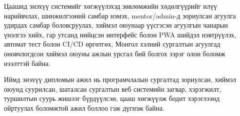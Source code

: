 Цаашид энэхүү системийг хөгжүүлэхэд зөвлөмжийн хөдөлгүүрийг илүү нарийвчлах, шинжилгээний самбар нэмэх, mentor/admin-д зориулсан агуулга удирдах самбар боловсруулах, хиймэл оюунаар үүсгэсэн агуулгын чанарын үнэлгээ хийх, гар утсанд нийцсэн интерфейс болон PWA шийдэл нэвтрүүлэх, автомат тест болон CI/CD өргөтгөх, Монгол хэлний сургалтын агуулгад оновчлогдсон хиймэл оюуны ажлын урсгал бий болгох зэрэг олон боломж нээлттэй байна.

Иймд энэхүү дипломын ажил нь програмчлалын сургалтад зориулсан, хиймэл оюунд суурилсан, шаталсан сургалтын веб системийн загвар, хэрэгжилт, туршилтын суурь жишээг бүрдүүлсэн, цааш хөгжүүлж бодит хэрэглээнд ойртуулах боломжтой ажил боллоо гэж дүгнэж байна.
